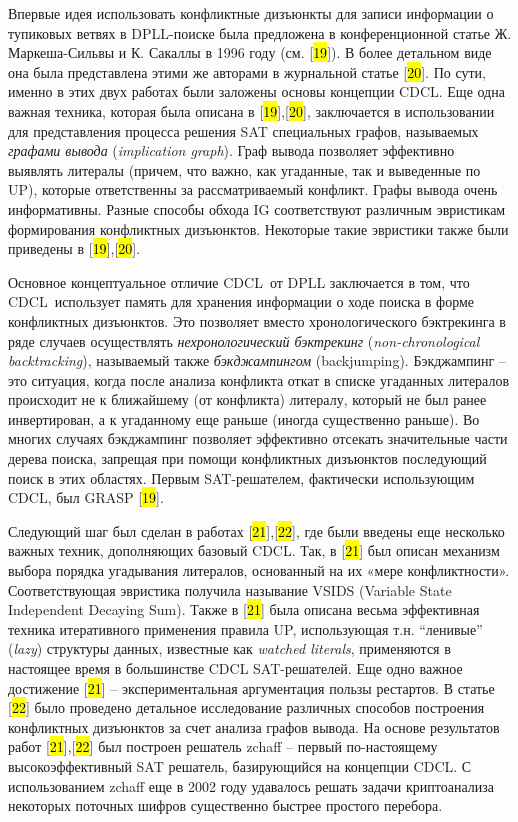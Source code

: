 Впервые идея использовать конфликтные дизъюнкты для записи информации о тупиковых ветвях в DPLL-поиске была предложена в конференционной статье Ж. Маркеша-Сильвы и К. Сакаллы в 1996 году (см. {[}\hl{19}{]}). В более детальном виде она была представлена этими же авторами в журнальной статье {[}\hl{20}{]}. По сути, именно в этих двух работах были заложены основы концепции CDCL. Еще одна важная техника, которая была описана в {[}\hl{19}{]},{[}\hl{20}{]}, заключается в использовании для представления процесса решения SAT специальных графов, называемых \textit{графами вывода} (\textit{implication graph}). Граф вывода позволяет эффективно выявлять литералы (причем, что важно, как угаданные, так и выведенные по UP), которые ответственны за рассматриваемый конфликт. Графы вывода очень информативны. Разные способы обхода IG соответствуют различным эвристикам формирования конфликтных дизъюнктов. Некоторые такие эвристики также были приведены в {[}\hl{19}{]},{[}\hl{20}{]}.

Основное концептуальное отличие CDCL~от DPLL заключается в том, что CDCL~использует память для хранения информации о ходе поиска в форме конфликтных дизъюнктов. Это позволяет вместо хронологического бэктрекинга в ряде случаев осуществлять \textit{нехронологический бэктрекинг} (\textit{non-chronological backtracking}), называемый также \textit{бэкджампингом} (backjumping). Бэкджампинг -- это ситуация, когда после анализа конфликта откат в списке угаданных литералов происходит не к ближайшему (от конфликта) литералу, который не был ранее инвертирован, а к угаданному еще раньше (иногда существенно раньше). Во многих случаях бэкджампинг позволяет эффективно отсекать значительные части дерева поиска, запрещая при помощи конфликтных дизъюнктов последующий поиск в этих областях. Первым SAT-решателем, фактически использующим CDCL, был GRASP {[}\hl{19}{]}.

Следующий шаг был сделан в работах {[}\hl{21}{]},{[}\hl{22}{]}, где были введены еще несколько важных техник, дополняющих базовый CDCL. Так, в {[}\hl{21}{]} был описан механизм выбора порядка угадывания литералов, основанный на их «мере конфликтности». Соответствующая эвристика получила называние VSIDS (Variable State Independent Decaying Sum). Также в {[}\hl{21}{]} была описана весьма эффективная техника итеративного применения правила UP, использующая т.н. \enquote{ленивые} (\textit{lazy}) структуры данных, известные как \textit{watched literals}, применяются в настоящее время в большинстве CDCL SAT-решателей. Еще одно важное достижение {[}\hl{21}{]} \--- экспериментальная аргументация пользы рестартов. В статье {[}\hl{22}{]} было проведено детальное исследование различных способов построения конфликтных дизъюнктов за счет анализа графов вывода. На основе результатов работ {[}\hl{21}{]},{[}\hl{22}{]} был построен решатель zchaff -- первый по-настоящему высокоэффективный SAT решатель, базирующийся на концепции CDCL. С использованием zchaff еще в 2002 году удавалось решать задачи криптоанализа некоторых поточных шифров существенно быстрее простого перебора.

